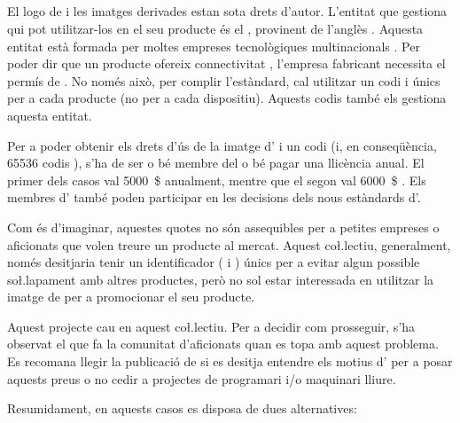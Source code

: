 \subsection{}
\label{subsec:usb-if}

El logo de  i les imatges derivades estan sota drets d'autor. L'entitat
que gestiona qui pot utilitzar-los en el seu producte és el ,
provinent de l'anglès . Aquesta entitat està
formada per moltes empreses tecnològiques multinacionals \cite{USBGetting}.
Per poder dir que un producte ofereix connectivitat , l'empresa
fabricant necessita el permís de . No només això, per complir
l'estàndard, cal utilitzar un codi  i  únics per a cada
producte (no per a cada dispositiu). Aquests codis també els gestiona aquesta
entitat.

Per a poder obtenir els drets d'ús de la imatge d' i un codi
 (i, en conseqüència, \num[round-mode=places,round-precision=0]{65536}
codis ), s'ha de ser o bé
membre del  o bé pagar una llicència anual. El
primer dels casos val \SI[round-mode=places,round-precision=0]{5000}{\$}
anualment, mentre que el segon
val \SI[round-mode=places,round-precision=0]{6000}{\$}
\cite{USBGetting}. Els membres d' també poden participar en les
decisions dels nous estàndards d'.

Com és d'imaginar, aquestes quotes no són assequibles per a petites empreses
o aficionats que volen treure un producte al mercat. Aquest co\l.lectiu,
generalment, només desitjaria tenir un identificador ( i )
únics per a evitar algun possible so\l.lapament amb altres productes, però
no sol estar interessada en utilitzar la imatge de  per a promocionar
el seu producte.

Aquest projecte cau en aquest co\l.lectiu. Per a decidir com prosseguir, s'ha
observat el que fa la comunitat d'aficionats quan es topa amb aquest problema.
Es recomana llegir la publicació de \cite{Johnson2023usb} si es desitja entendre
els motius d' per a posar aquests preus o no cedir 
a projectes de programari i/o maquinari lliure.

Resumidament, en aquests casos es disposa de dues alternatives:

